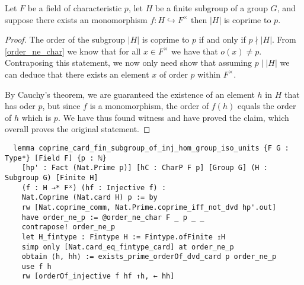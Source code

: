 \begin{lemma}
  \label{coprime_card_fin_subgroup_of_inj_hom_group_iso_units}
  \leanok
  Let $F$ be a field of characteristic $p$, let $H$ be a finite subgroup of a group $G$, and suppose there exists an monomorphism $f : H \hookrightarrow F^\times$
  then $|H|$ is coprime to $p$.
\end{lemma}
\begin{proof}
\leanok
The order of the subgroup $|H|$ is coprime to $p$ if and only if $p \nmid |H|$. From \ref{order_ne_char} we know that
for all $x \in F^\times$ we have that $o(x) \ne p$. Contraposing this statement, we now only need show that assuming $p \mid |H|$ we can deduce that
there exists an element $x$ of order $p$ within $F^\times$.

By Cauchy's theorem, we are guaranteed the existence of an element $h$ in $H$ that has oder $p$, but since $f$ is a monomorphism, the order of $f(h)$ equals the order of $h$ which is $p$.
We have thus found witness and have proved the claim, which overall proves the original statement.
\end{proof}
\begin{footnotesize}
  \begin{verbatim}
  lemma coprime_card_fin_subgroup_of_inj_hom_group_iso_units {F G : Type*} [Field F] {p : ℕ}
    [hp' : Fact (Nat.Prime p)] [hC : CharP F p] [Group G] (H : Subgroup G) [Finite H]
    (f : H →* Fˣ) (hf : Injective f) :
    Nat.Coprime (Nat.card H) p := by
    rw [Nat.coprime_comm, Nat.Prime.coprime_iff_not_dvd hp'.out]
    have order_ne_p := @order_ne_char F _ p _ _
    contrapose! order_ne_p
    let H_fintype : Fintype H := Fintype.ofFinite ↥H
    simp only [Nat.card_eq_fintype_card] at order_ne_p
    obtain ⟨h, hh⟩ := exists_prime_orderOf_dvd_card p order_ne_p
    use f h
    rw [orderOf_injective f hf ↑h, ← hh]
  \end{verbatim}
  \end{footnotesize}


